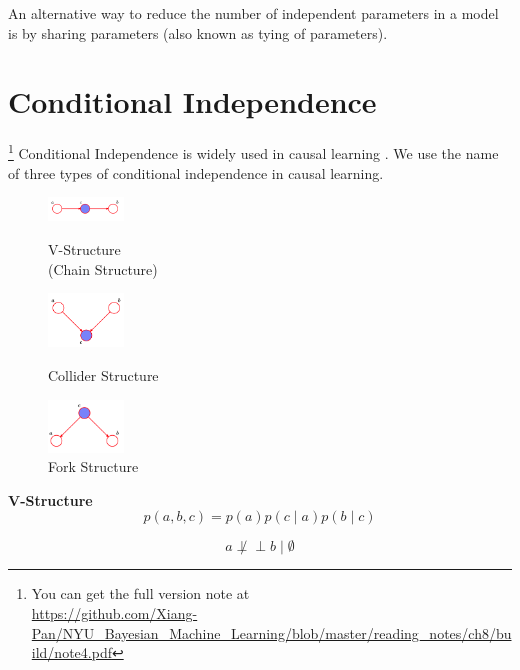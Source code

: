 \documentclass{article}
\def\ci{\perp\!\!\!\perp}
\begin{document}
An alternative way to reduce the number of independent parameters in a model is by sharing parameters (also known as tying of parameters).
\section{Conditional Independence}
\footnote{You can get the full version note at \\\url{https://github.com/Xiang-Pan/NYU_Bayesian_Machine_Learning/blob/master/reading_notes/ch8/build/note4.pdf}}
Conditional Independence is widely used in causal learning \cite{pearl2016causal}. We use the name of three types of conditional independence in causal learning.
\begin{figure}[!htb]
    \centering
    \begin{minipage}[t]{0.32\textwidth}
        \centering
        \includegraphics[width=2cm]{./images/2021-09-15-17-49-28.png}
        \caption{V-Structure \\ (Chain Structure)}
    \end{minipage}
    \begin{minipage}[t]{0.32\textwidth}
        \centering
        \includegraphics[width=2cm]{./images/2021-09-15-17-43-00.png}
        \caption{Collider Structure} 
    \end{minipage}
    \begin{minipage}[t]{0.32\textwidth}
        \centering
        \includegraphics[width=2cm]{./images/2021-09-15-17-43-54.png}
        \caption{Fork Structure}
    \end{minipage}
\end{figure}

\newpage
\textbf{V-Structure}
\begin{equation}
    p(a, b, c)=p(a) p(c \mid a) p(b \mid c)
\end{equation}

\begin{equation}
    a \not \ci b \mid \emptyset
\end{equation}
\end{document}
